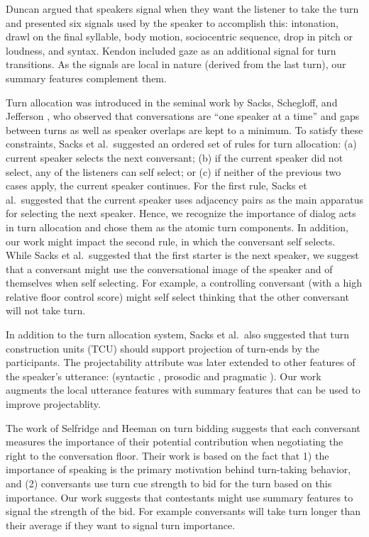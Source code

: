 Duncan \cite{duncan1972some} argued that speakers signal when they want the listener to take the turn and presented six signals used by the speaker to accomplish this: intonation, drawl on the final syllable, body motion, sociocentric sequence, drop in pitch or loudness, and syntax. Kendon \cite{kendon1967some} included gaze as an additional signal for turn transitions. As the signals are local in nature (derived from the last turn), our summary features complement them.


Turn allocation was introduced in the seminal work by Sacks, Schegloff, and Jefferson \cite{sacks1974simplest}, who observed that conversations are ``one speaker at a time'' and gaps between turns as well as speaker overlaps are kept to a minimum. To satisfy these constraints, Sacks et al.~suggested an ordered set of rules for turn allocation:
%
(a) current speaker selects the next conversant; (b) if the current speaker did not select, any of the listeners can self select; or (c) if neither of the previous two cases apply, the current speaker continues.
%
For the first rule, Sacks et al.~suggested that the current speaker uses adjacency pairs as the main apparatus for selecting the next speaker. Hence, we recognize the importance of dialog acts in turn allocation and chose them as the atomic turn components.
In addition, our work might impact the second rule, in which the conversant self selects. While Sacks et al.~suggested that the first starter is the next speaker, we suggest that a conversant might use the conversational image of the speaker and of themselves when self selecting. For example, a controlling conversant (with a high relative floor control score) might self select thinking that the other conversant will not take turn.

In addition to the turn allocation system, Sacks et al.~also suggested that turn construction units (TCU) should support projection of turn-ends by the participants. The projectability attribute was later extended to other features of the speaker's utterance: (syntactic \cite{sacks1974simplest}, prosodic \cite{ford1996interactional} and pragmatic \cite{ford1996interactional,ford2001intersection}). Our work augments the local utterance features with summary features that can be used to improve projectablity.

The work of Selfridge and Heeman \cite{SelfridgeHeeman10:acl} on turn bidding suggests that each conversant measures the importance of their potential contribution when negotiating the right to the conversation floor. Their work
is based on the fact that 1) the importance of speaking is the primary motivation behind turn-taking behavior, and (2) conversants use turn cue strength to bid for the turn based on this importance. Our work suggests that contestants might use summary features to signal the strength of the bid. For example conversants will take turn longer than their average if they want to signal turn importance.


